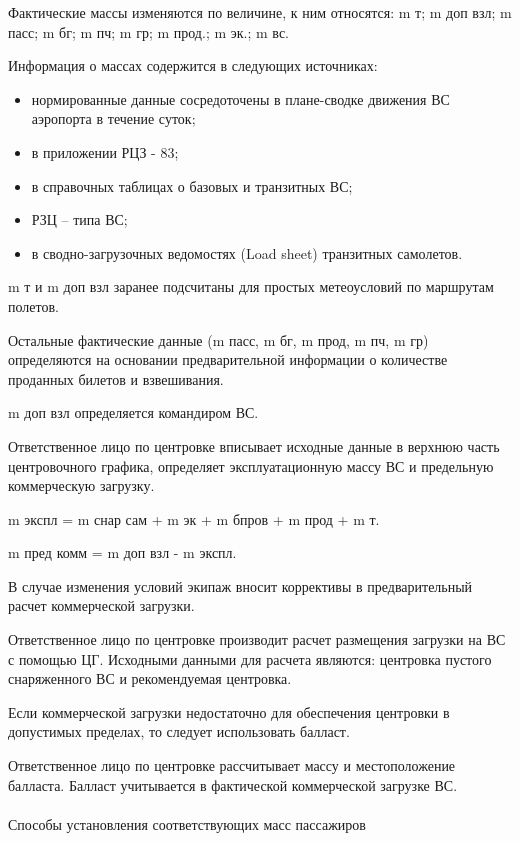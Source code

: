 Фактические массы изменяются по величине, к ним относятся: m т; m доп взл; m пасс; m бг; m пч; m гр; m прод.; m эк.; m вс. 

Информация о массах содержится в следующих источниках:
\begin{itemize}
    \item нормированные данные сосредоточены в плане-сводке движения ВС аэропорта в течение суток;
    \item в приложении РЦЗ - 83;
    \item в справочных таблицах о базовых и транзитных ВС;
    \item РЗЦ – типа ВС;
    \item в сводно-загрузочных ведомостях (Load sheet) транзитных самолетов.
\end{itemize}

m т и m доп взл заранее подсчитаны для простых метеоусловий по маршрутам полетов. 

Остальные фактические данные (m пасс, m бг, m прод, m пч, m гр) определяются на основании предварительной информации о количестве проданных билетов и взвешивания.

m доп взл определяется командиром ВС.

Ответственное лицо по центровке вписывает исходные данные в верхнюю часть центровочного графика, определяет эксплуатационную массу ВС и предельную коммерческую загрузку.

m экспл = m снар сам + m эк + m бпров + m прод + m т.

m пред комм = m доп взл - m экспл.

В случае изменения условий экипаж вносит коррективы в предварительный расчет коммерческой загрузки.

Ответственное лицо по центровке производит расчет размещения загрузки на ВС с помощью ЦГ. Исходными данными для расчета являются: центровка пустого снаряженного ВС и рекомендуемая центровка.

Если коммерческой загрузки недостаточно для обеспечения центровки в допустимых пределах, то следует использовать балласт.

Ответственное лицо по центровке рассчитывает массу и местоположение балласта. Балласт учитывается в фактической коммерческой загрузке ВС.

\paragraph{} Способы установления соответствующих масс пассажиров


